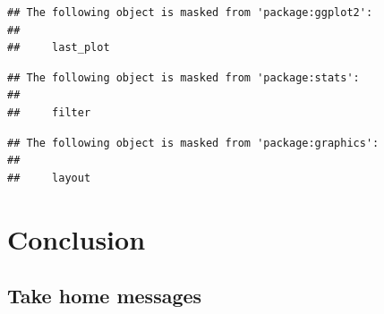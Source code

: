 \documentclass[
]{book}
\newenvironment{Shaded}{\begin{snugshade}}{\end{snugshade}}
\newcommand{\AttributeTok}[1]{\textcolor[rgb]{0.77,0.63,0.00}{#1}}
\newcommand{\FunctionTok}[1]{\textcolor[rgb]{0.00,0.00,0.00}{#1}}
\newcommand{\NormalTok}[1]{#1}
\newcommand{\SpecialCharTok}[1]{\textcolor[rgb]{0.00,0.00,0.00}{#1}}
\newcommand{\StringTok}[1]{\textcolor[rgb]{0.31,0.60,0.02}{#1}}
\begin{document}
\begin{verbatim}
## The following object is masked from 'package:ggplot2':
## 
##     last_plot
\end{verbatim}

\begin{verbatim}
## The following object is masked from 'package:stats':
## 
##     filter
\end{verbatim}

\begin{verbatim}
## The following object is masked from 'package:graphics':
## 
##     layout
\end{verbatim}

\begin{Shaded}
\end{Shaded}

\hypertarget{conclusion}{%
\chapter{Conclusion}\label{conclusion}}

\hypertarget{take-home-messages}{%
\section{Take home messages}\label{take-home-messages}}
\end{document}
